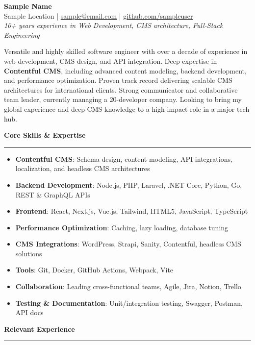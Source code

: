 \documentclass[a4paper,10pt]{article}
\newcommand{\sectiontitle}[1]{\vspace{6pt}\noindent\textbf{\large #1}\vspace{3pt}\hrule\vspace{6pt}}
\begin{document}
	
	\begin{center}
		{\LARGE \textbf{Sample Name}}\\
		\vspace{2pt}
		Sample Location \quad | \quad \href{mailto:sample@email.com}{sample@email.com} \quad | \quad
		\href{https://github.com/sampleuser}{github.com/sampleuser} \\
		\vspace{2pt}
		\textit{10+ years experience in Web Development, CMS architecture, Full-Stack Engineering}
	\end{center}
	
	Versatile and highly skilled software engineer with over a decade of experience in web development, CMS design, and API integration. Deep expertise in \textbf{Contentful CMS}, including advanced content modeling, backend development, and performance optimization. Proven track record delivering scalable CMS architectures for international clients. Strong communicator and collaborative team leader, currently managing a 20-developer company. Looking to bring my global experience and deep CMS knowledge to a high-impact role in a major tech hub.
	
	\sectiontitle{Core Skills \& Expertise}
	\begin{itemize}
		\item \textbf{Contentful CMS}: Schema design, content modeling, API integrations, localization, and headless CMS architectures
		\item \textbf{Backend Development}: Node.js, PHP, Laravel, .NET Core, Python, Go, REST \& GraphQL APIs
		\item \textbf{Frontend}: React, Next.js, Vue.js, Tailwind, HTML5, JavaScript, TypeScript
		\item \textbf{Performance Optimization}: Caching, lazy loading, database tuning
		\item \textbf{CMS Integrations}: WordPress, Strapi, Sanity, Contentful, headless CMS solutions
		\item \textbf{Tools}: Git, Docker, GitHub Actions, Webpack, Vite
		\item \textbf{Collaboration}: Leading cross-functional teams, Agile, Jira, Notion, Trello
		\item \textbf{Testing \& Documentation}: Unit/integration testing, Swagger, Postman, API docs
	\end{itemize}
	
	\sectiontitle{Relevant Experience}
	
\end{document}
